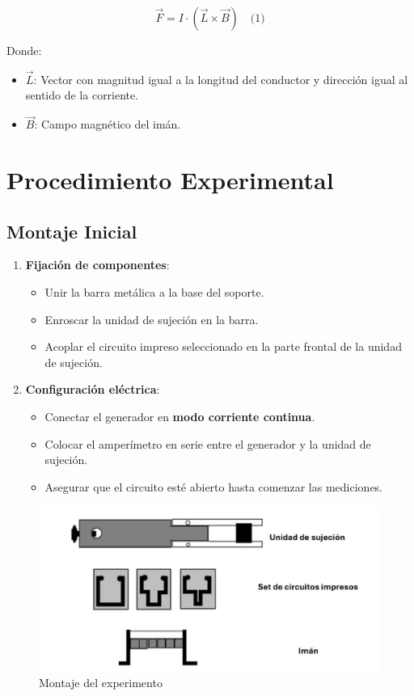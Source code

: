 \documentclass{article}
\begin{document}
\[
\vec{F} = I \cdot (\vec{L} \times \vec{B}) \quad \text{(1)}
\]

Donde:
\begin{itemize}
    \item \( \vec{L} \): Vector con magnitud igual a la longitud del conductor y dirección igual al sentido de la corriente.
    \item \( \vec{B} \): Campo magnético del imán.
\end{itemize}

\section{Procedimiento Experimental}
\subsection{Montaje Inicial}
\begin{enumerate}
    \item \textbf{Fijación de componentes}:
    \begin{itemize}
        \item Unir la barra metálica a la base del soporte.
        \item Enroscar la unidad de sujeción en la barra.
        \item Acoplar el circuito impreso seleccionado en la parte frontal de la unidad de sujeción.
    \end{itemize}
    
    \item \textbf{Configuración eléctrica}:
    \begin{itemize}
        \item Conectar el generador en \textbf{modo corriente continua}.
        \item Colocar el amperímetro en serie entre el generador y la unidad de sujeción.
        \item Asegurar que el circuito esté abierto hasta comenzar las mediciones.
    \end{itemize}
\end{enumerate}
\begin{figure}[H]
    \centering
    \includegraphics[scale=0.35]{images/elementosExp.png}
    \caption{Montaje del experimento}
\end{figure}
\end{document}
